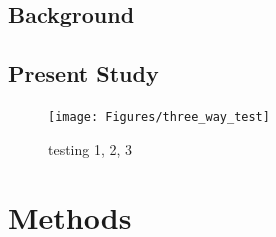 \documentclass[
12pt, %
english, %
doublespacing, %
nolistspacing, %
liststotoc, %
headsepline, %
chapterinoneline, %
openany, %
]{DoctoralThesis}\usepackage[]{graphicx}\usepackage[]{color}
\begin{document}

\subsection{Background}



\subsection{Present Study}


\begin{figure}[th]
\centering
\texttt{[image: Figures/three\_way\_test]}
\decoRule
\caption[A test of figures]{testing 1, 2, 3}
\label{fig:Test}
\end{figure}




\section{Methods}

\end{document}
